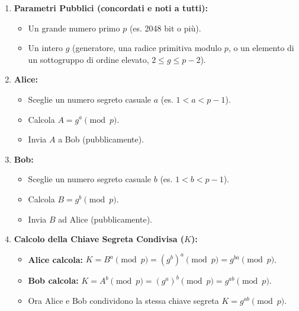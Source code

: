 \documentclass{article}
\begin{document}
\begin{itemize}
\begin{enumerate}
            \item \textbf{Parametri Pubblici (concordati e noti a tutti):}
                \begin{itemize}
                    \item Un grande numero primo $p$ (es. 2048 bit o più).
                    \item Un intero $g$ (generatore, una radice primitiva modulo $p$, o un elemento di un sottogruppo di ordine elevato, $2 \le g \le p-2$).
                \end{itemize}
            \item \textbf{Alice:}
                \begin{itemize}
                    \item Sceglie un numero segreto casuale $a$ (es. $1 < a < p-1$).
                    \item Calcola $A = g^a \pmod{p}$.
                    \item Invia $A$ a Bob (pubblicamente).
                \end{itemize}
            \item \textbf{Bob:}
                \begin{itemize}
                    \item Sceglie un numero segreto casuale $b$ (es. $1 < b < p-1$).
                    \item Calcola $B = g^b \pmod{p}$.
                    \item Invia $B$ ad Alice (pubblicamente).
                \end{itemize}
            \item \textbf{Calcolo della Chiave Segreta Condivisa ($K$):}
                \begin{itemize}
                    \item \textbf{Alice calcola:} $K = B^a \pmod{p} = (g^b)^a \pmod{p} = g^{ba} \pmod{p}$.
                    \item \textbf{Bob calcola:} $K = A^b \pmod{p} = (g^a)^b \pmod{p} = g^{ab} \pmod{p}$.
                    \item Ora Alice e Bob condividono la stessa chiave segreta $K = g^{ab} \pmod{p}$.
                \end{itemize}
        \end{enumerate}
        \begin{figure}[H]
        \centering
\end{figure}
\end{itemize}
\end{document}
